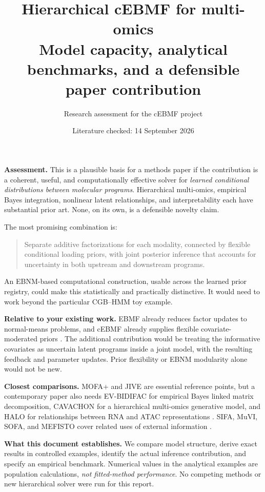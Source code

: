\documentclass[11pt,a4paper]{article}
\title{Hierarchical cEBMF for multi-omics\\[5pt]
\large Model capacity, analytical benchmarks, and a defensible paper contribution}
\author{Research assessment for the cEBMF project}
\date{Literature checked: 14 September 2026}
\numberwithin{equation}{section}
\begin{document}
\maketitle

\textbf{Assessment.} This is a plausible basis for a methods paper if the
contribution is a coherent, useful, and computationally effective solver for
\emph{learned conditional distributions between molecular programs}.
Hierarchical multi-omics, empirical Bayes integration, nonlinear latent
relationships, and interpretability each have substantial prior art. None,
on its own, is a defensible novelty claim.

The most promising combination is:
\begin{quote}
Separate additive factorizations for each modality, connected by flexible
conditional loading priors, with joint posterior inference that accounts for
uncertainty in both upstream and downstream programs.
\end{quote}
An EBNM-based computational construction, usable across the learned prior
registry, could make this statistically and practically distinctive.
It would need to work beyond the particular CGB--HMM toy example.

\textbf{Relative to your existing work.} EBMF already reduces factor
updates to normal-means problems, and cEBMF already supplies flexible
covariate-moderated priors \cite{ebmf,cebmf}. The additional contribution
would be treating the informative covariates as uncertain latent programs
inside a joint model, with the resulting feedback and parameter updates.
Prior flexibility or EBNM modularity alone would not be new.

\textbf{Closest comparisons.}
MOFA+ and JIVE are essential reference points, but a contemporary paper also
needs EV-BIDIFAC for empirical Bayes linked matrix decomposition,
CAVACHON for a hierarchical multi-omics generative model, and HALO for
relationships between RNA and ATAC representations
\cite{mofa,jive,evbidifac,cavachon,halo}.
SIFA, MuVI, SOFA, and MEFISTO cover related uses of external information
\cite{sifa,muvi,sofa,mefisto}.

\textbf{What this document establishes.}
We compare model structure, derive exact results in controlled examples,
identify the actual inference contribution, and specify an empirical
benchmark. Numerical values in the analytical examples are population
calculations, \emph{not fitted-method performance}. No competing methods or
new hierarchical solver were run for this report.
\end{document}
